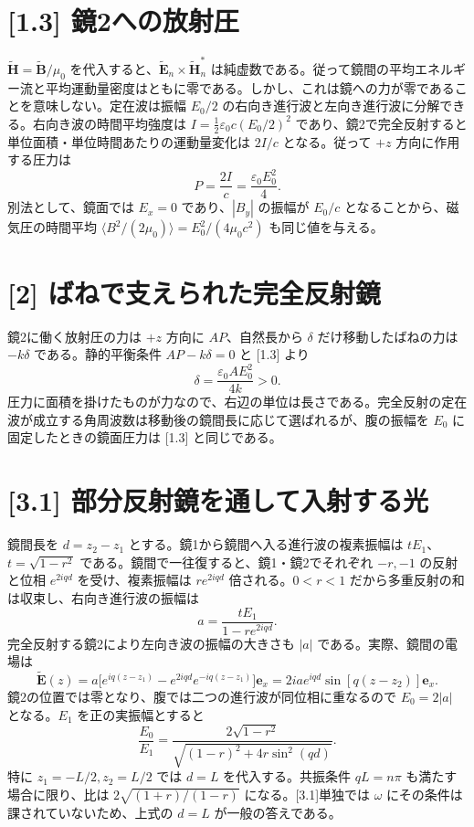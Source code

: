 \documentclass[11pt,a4paper]{article}
\begin{document}
\section*{[1.3] 鏡2への放射圧}
$\widetilde{\boldsymbol H}=\widetilde{\boldsymbol B}/\mu_0$ を代入すると、$\widetilde{\boldsymbol E}_n\times\widetilde{\boldsymbol H}_n^*$ は純虚数である。従って鏡間の平均エネルギー流と平均運動量密度はともに零である。しかし、これは鏡への力が零であることを意味しない。定在波は振幅 $E_0/2$ の右向き進行波と左向き進行波に分解できる。右向き波の時間平均強度は $I=\tfrac12\varepsilon_0c(E_0/2)^2$ であり、鏡2で完全反射すると単位面積・単位時間あたりの運動量変化は $2I/c$ となる。従って $+z$ 方向に作用する圧力は
\[
 \boxed{P=\frac{2I}{c}=\frac{\varepsilon_0E_0^2}{4}}.
\]
別法として、鏡面では $E_x=0$ であり、$|B_y|$ の振幅が $E_0/c$ となることから、磁気圧の時間平均 $\langle B^2/(2\mu_0)\rangle=E_0^2/(4\mu_0c^2)$ も同じ値を与える。

\section*{[2] ばねで支えられた完全反射鏡}
鏡2に働く放射圧の力は $+z$ 方向に $AP$、自然長から $\delta$ だけ移動したばねの力は $-k\delta$ である。静的平衡条件 $AP-k\delta=0$ と [1.3] より
\[
 \boxed{\delta=\frac{\varepsilon_0AE_0^2}{4k}>0}.
\]
圧力に面積を掛けたものが力なので、右辺の単位は長さである。完全反射の定在波が成立する角周波数は移動後の鏡間長に応じて選ばれるが、腹の振幅を $E_0$ に固定したときの鏡面圧力は [1.3] と同じである。

\section*{[3.1] 部分反射鏡を通して入射する光}
鏡間長を $d=z_2-z_1$ とする。鏡1から鏡間へ入る進行波の複素振幅は $tE_1$、$t=\sqrt{1-r^2}$ である。鏡間で一往復すると、鏡1・鏡2でそれぞれ $-r,-1$ の反射と位相 $e^{2iqd}$ を受け、複素振幅は $r e^{2iqd}$ 倍される。$0<r<1$ だから多重反射の和は収束し、右向き進行波の振幅は
\[
 a=\frac{tE_1}{1-r e^{2iqd}}.
\]
完全反射する鏡2により左向き波の振幅の大きさも $|a|$ である。実際、鏡間の電場は
\[
 \widetilde{\boldsymbol E}(z)
 =a\bigl[e^{iq(z-z_1)}-e^{2iqd}e^{-iq(z-z_1)}\bigr]\boldsymbol e_x
 =2ia e^{iqd}\sin[q(z-z_2)]\boldsymbol e_x.
\]
鏡2の位置では零となり、腹では二つの進行波が同位相に重なるので $E_0=2|a|$ となる。$E_1$ を正の実振幅とすると
\[
 \boxed{\frac{E_0}{E_1}=
 \frac{2\sqrt{1-r^2}}{\sqrt{(1-r)^2+4r\sin^2(qd)}}}.
\]
特に $z_1=-L/2,z_2=L/2$ では $d=L$ を代入する。共振条件 $qL=n\pi$ も満たす場合に限り、比は $2\sqrt{(1+r)/(1-r)}$ になる。[3.1]単独では $\omega$ にその条件は課されていないため、上式の $d=L$ が一般の答えである。
\end{document}
